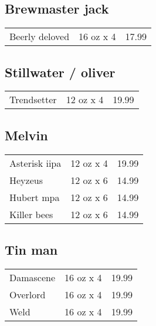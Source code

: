\documentclass{article}%
\begin{document}
\begin{multicols}{3}
%
\subsection*{Brewmaster jack}%
\begin{tabular}{l c r}%
Beerly deloved&16 oz x 4&17.99\\%
\end{tabular}

%
\subsection*{Stillwater / oliver}%
\begin{tabular}{l c r}%
Trendsetter&12 oz x 4&19.99\\%
\end{tabular}

%
\subsection*{Melvin}%
\begin{tabular}{l c r}%
Asterisk iipa&12 oz x 4&19.99\\%
Heyzeus&12 oz x 6&14.99\\%
Hubert mpa&12 oz x 6&14.99\\%
Killer bees&12 oz x 6&14.99\\%
\end{tabular}

%
\subsection*{Tin man}%
\begin{tabular}{l c r}%
Damascene&16 oz x 4&19.99\\%
Overlord&16 oz x 4&19.99\\%
Weld&16 oz x 4&19.99\\%
\end{tabular}

%
\end{multicols}%
\end{document}
